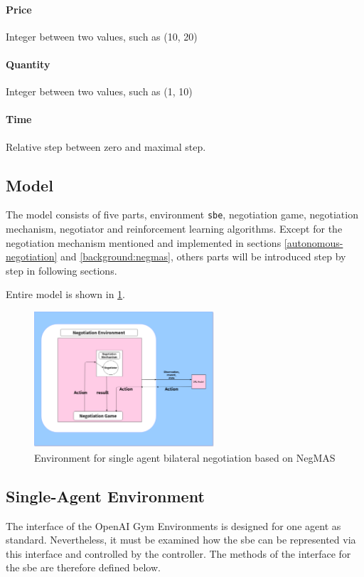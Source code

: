 \paragraph{Price} Integer between two values, such as (10, 20)
\paragraph{Quantity} Integer between two values, such as (1, 10)
\paragraph{Time} Relative step between zero and maximal step.

\subsection{Model}
The model consists of five parts, environment \texttt{\gls{sbe}}, negotiation game, negotiation mechanism, negotiator and reinforcement learning algorithms.
Except for the negotiation mechanism mentioned and implemented in sections \ref{autonomous-negotiation} and \ref{background:negmas}, others parts will be introduced step by step in following sections. 

Entire model is shown in \ref{fig:environment-single-agent}.
\begin{figure}[htbp]
\centering
\includegraphics[width=0.60\textwidth]{./images/environment-single-agent.png}
\caption{Environment for single agent bilateral negotiation based on NegMAS}
\label{fig:environment-single-agent}
\end{figure}

\subsection{Single-Agent Environment} \label{single-agent-env}
The interface of the OpenAI Gym Environments is designed for one agent as standard. Nevertheless, it must be examined how the \gls{sbe} can be represented via this interface and controlled by the controller. The methods of the interface for the \gls{sbe} are therefore defined below. 

